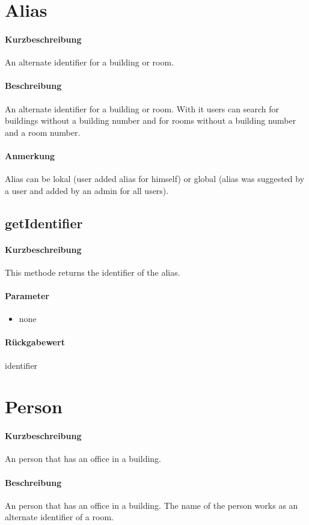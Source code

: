\section{Alias}
\paragraph*{Kurzbeschreibung}
An alternate identifier for a building or room.
\paragraph*{Beschreibung}
An alternate identifier for a building or room. 
With it users can search for buildings without a building number and for rooms without a building number and a room number.
\paragraph*{Anmerkung}
Alias can be lokal (user added alias for himself) or global (alias was suggested by a user and added by an admin for all users).

\subsection{getIdentifier}%
\paragraph*{Kurzbeschreibung}
This methode returns the identifier of the alias.
\paragraph*{Parameter}
\begin{itemize}
    \item none
\end{itemize}
\paragraph*{Rückgabewert}
identifier


\section{Person}
\paragraph*{Kurzbeschreibung}
An person that has an office in a building.
\paragraph*{Beschreibung}
An person that has an office in a building. The name of the person works as an alternate identifier of a room.
